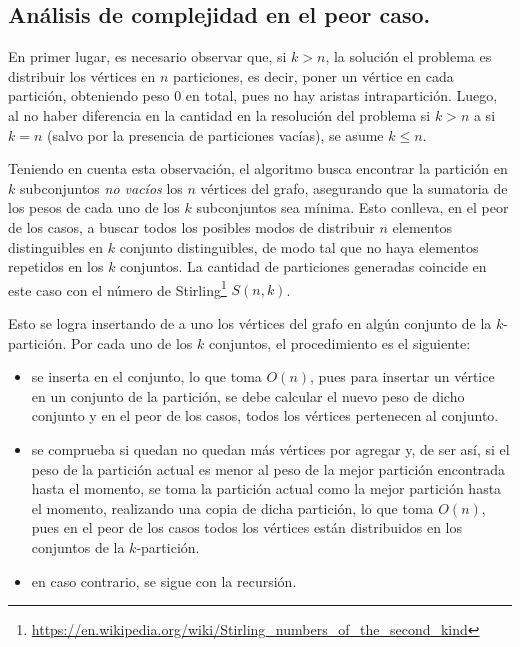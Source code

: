 \newpage

\subsection{Análisis de complejidad en el peor caso.}
\vspace*{0.3cm}

En primer lugar, es necesario observar que, si $k > n$, la solución el problema
es distribuir los vértices en $n$ particiones, es decir, poner un vértice en
cada partición, obteniendo peso $0$ en total, pues no hay aristas
intrapartición. Luego, al no haber diferencia en la cantidad en la resolución
del problema si $k > n$ a si $k = n$ (salvo por la presencia de particiones
vacías), se asume $k \le n$.

Teniendo en cuenta esta observación, el algoritmo busca encontrar la
partición en $k$ subconjuntos \textit{no vacíos} los $n$ vértices del grafo,
asegurando que la sumatoria de los pesos de cada uno de los $k$ subconjuntos
sea mínima. Esto conlleva, en el peor de los casos, a buscar todos los posibles
modos de distribuir $n$ elementos distinguibles en $k$ conjunto distinguibles,
de modo tal que no haya elementos repetidos en los $k$ conjuntos. La cantidad
de particiones generadas coincide en este caso con el número de
Stirling\footnote{
\url{https://en.wikipedia.org/wiki/Stirling_numbers_of_the_second_kind}} $S(n,
k)$.

Esto se logra insertando de a uno los vértices del grafo en algún conjunto de
la $k$-partición. Por cada uno de los $k$ conjuntos, el procedimiento es el
siguiente:
\begin{itemize}
  \item se inserta en el conjunto, lo que toma $O(n)$, pues para insertar un
  vértice en un conjunto de la partición, se debe calcular el nuevo peso de
  dicho conjunto y en el peor de los casos, todos los vértices pertenecen al
  conjunto.
  \item se comprueba si quedan no quedan más vértices por agregar y, de ser
  así, si el peso de la partición actual es menor al peso de la mejor partición
  encontrada hasta el momento, se toma la partición actual como la mejor
  partición hasta el momento, realizando una copia de dicha partición, lo que
  toma $O(n)$, pues en el peor de los casos todos los vértices están
  distribuidos en los conjuntos de la $k$-partición.
  \item en caso contrario, se sigue con la recursión.
\end{itemize}

